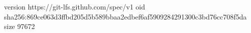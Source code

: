 version https://git-lfs.github.com/spec/v1
oid sha256:869ce063d3ffbd205d5b589bbaa2edbef6af5909284291300c3bd76cc708f5da
size 97672
